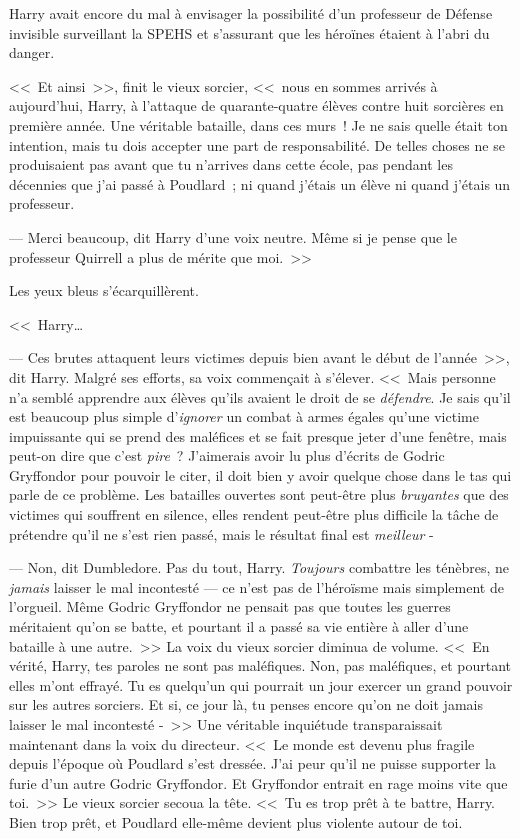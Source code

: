Harry avait encore du mal à envisager la possibilité d'un professeur de Défense invisible surveillant la SPEHS et s'assurant que les héroïnes étaient à l'abri du danger.

<<~Et ainsi~>>, finit le vieux sorcier, <<~nous en sommes arrivés à aujourd'hui, Harry, à l'attaque de quarante-quatre élèves contre huit sorcières en première année. Une véritable bataille, dans ces murs~! Je ne sais quelle était ton intention, mais tu dois accepter une part de responsabilité. De telles choses ne se produisaient pas avant que tu n'arrives dans cette école, pas pendant les décennies que j'ai passé à Poudlard~; ni quand j'étais un élève ni quand j'étais un professeur.

--- Merci beaucoup, dit Harry d'une voix neutre. Même si je pense que le professeur Quirrell a plus de mérite que moi.~>>

Les yeux bleus s'écarquillèrent.

<<~Harry…

--- Ces brutes attaquent leurs victimes depuis bien avant le début de l'année~>>, dit Harry. Malgré ses efforts, sa voix commençait à s'élever. <<~Mais personne n'a semblé apprendre aux élèves qu'ils avaient le droit de se \emph{défendre}. Je sais qu'il est beaucoup plus simple d'\emph{ignorer} un combat à armes égales qu'une victime impuissante qui se prend des maléfices et se fait presque jeter d'une fenêtre, mais peut-on dire que c'est \emph{pire}~? J'aimerais avoir lu plus d'écrits de Godric Gryffondor pour pouvoir le citer, il doit bien y avoir quelque chose dans le tas qui parle de ce problème. Les batailles ouvertes sont peut-être plus \emph{bruyantes} que des victimes qui souffrent en silence, elles rendent peut-être plus difficile la tâche de prétendre qu'il ne s'est rien passé, mais le résultat final est \emph{meilleur} -

--- Non, dit Dumbledore. Pas du tout, Harry. \emph{Toujours} combattre les ténèbres, ne \emph{jamais} laisser le mal incontesté — ce n'est pas de l'héroïsme mais simplement de l'orgueil. Même Godric Gryffondor ne pensait pas que toutes les guerres méritaient qu'on se batte, et pourtant il a passé sa vie entière à aller d'une bataille à une autre.~>> La voix du vieux sorcier diminua de volume. <<~En vérité, Harry, tes paroles ne sont pas maléfiques. Non, pas maléfiques, et pourtant elles m'ont effrayé. Tu es quelqu'un qui pourrait un jour exercer un grand pouvoir sur les autres sorciers. Et si, ce jour là, tu penses encore qu'on ne doit jamais laisser le mal incontesté -~>> Une véritable inquiétude transparaissait maintenant dans la voix du directeur. <<~Le monde est devenu plus fragile depuis l'époque où Poudlard s'est dressée. J'ai peur qu'il ne puisse supporter la furie d'un autre Godric Gryffondor. Et Gryffondor entrait en rage moins vite que toi.~>> Le vieux sorcier secoua la tête. <<~Tu es trop prêt à te battre, Harry. Bien trop prêt, et Poudlard elle-même devient plus violente autour de toi.


